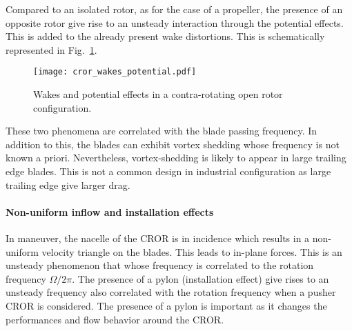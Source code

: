 Compared to an isolated rotor, as for the case of a propeller,
the presence of an opposite rotor give rise to an unsteady
interaction through the potential effects.
This is added to the already present wake distortions. This is
schematically represented in Fig.~\ref{fig:cror_wakes_potential}.
\begin{figure}[htb]
  \centering
  \texttt{[image: cror\_wakes\_potential.pdf]}
  \caption{Wakes and potential effects in a 
  contra-rotating open rotor configuration.}
  \label{fig:cror_wakes_potential}
\end{figure}
These two phenomena are correlated with the blade passing frequency.
In addition to this, the blades can exhibit vortex shedding whose frequency
is not known a priori.
Nevertheless,
vortex-shedding is likely to appear in large trailing edge blades.
This is not a common design in industrial configuration as large trailing edge
give larger drag.

\paragraph{Non-uniform inflow and installation effects}

In maneuver, the nacelle of the CROR is in incidence
which results in a non-uniform velocity triangle on the blades.
This leads to in-plane forces. This is an unsteady phenomenon that
whose frequency is correlated to the rotation frequency $\Omega / 2 \pi$.
The presence of a pylon (installation effect) give rises to an unsteady frequency
also correlated with the rotation frequency when a pusher CROR is considered. The presence of a pylon
is important as it changes the performances and flow behavior around the CROR.
